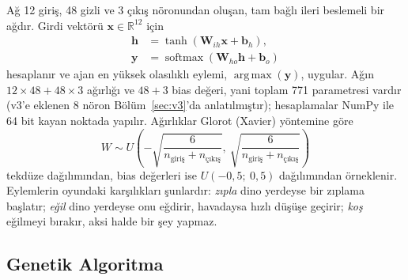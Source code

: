 \documentclass[11pt,a4paper]{article}
\begin{document}
Ağ 12 giriş, 48 gizli ve 3 çıkış nöronundan oluşan, tam bağlı ileri beslemeli bir ağdır. Girdi vektörü $\mathbf{x}\in\mathbb{R}^{12}$ için
\begin{align}
  \mathbf{h} &= \tanh(\mathbf{W}_{ih}\mathbf{x}+\mathbf{b}_{h}),\\
  \mathbf{y} &= \operatorname{softmax}(\mathbf{W}_{ho}\mathbf{h}+\mathbf{b}_{o})
\end{align}
hesaplanır ve ajan en yüksek olasılıklı eylemi, $\operatorname*{arg\,max}(\mathbf{y})$, uygular. Ağın $12\times48 + 48\times3$ ağırlığı ve $48 + 3$ bias değeri, yani toplam 771 parametresi vardır (v3'e eklenen 8 nöron Bölüm~\ref{sec:v3}'da anlatılmıştır); hesaplamalar NumPy \cite{numpy} ile 64 bit kayan noktada yapılır. Ağırlıklar Glorot (Xavier) yöntemine göre \cite{glorot2010}
\begin{equation}
  W \sim U\!\left(-\sqrt{\frac{6}{n_{\text{giriş}}+n_{\text{çıkış}}}},\ \sqrt{\frac{6}{n_{\text{giriş}}+n_{\text{çıkış}}}}\right)
\end{equation}
tekdüze dağılımından, bias değerleri ise $U(-0{,}5;\ 0{,}5)$ dağılımından örneklenir. Eylemlerin oyundaki karşılıkları şunlardır: \emph{zıpla} dino yerdeyse bir zıplama başlatır; \emph{eğil} dino yerdeyse onu eğdirir, havadaysa hızlı düşüşe geçirir; \emph{koş} eğilmeyi bırakır, aksi halde bir şey yapmaz.

\subsection{Genetik Algoritma}
\end{document}
